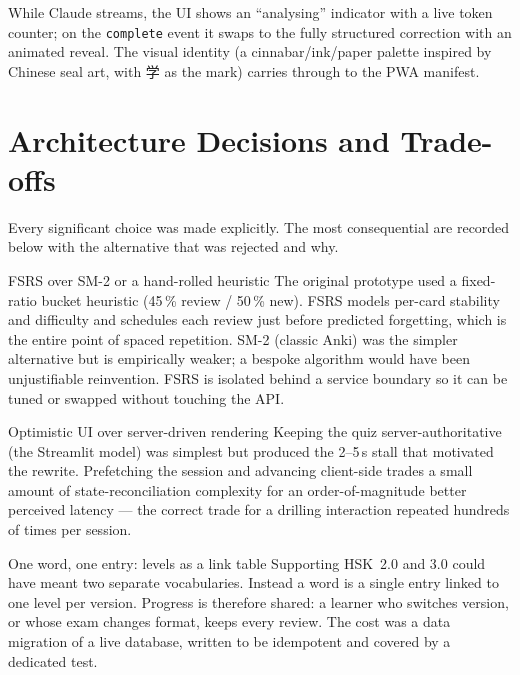 \documentclass[11pt,a4paper]{article}
\newcommand{\han}[1]{{#1}}
\begin{document}
While Claude streams, the UI shows an ``analysing'' indicator with a live token
counter; on the \texttt{complete} event it swaps to the fully structured
correction with an animated reveal. The visual identity (a cinnabar/ink/paper
palette inspired by Chinese seal art, with \han{学} as the mark) carries
through to the PWA manifest.

\section{Architecture Decisions and Trade-offs}

Every significant choice was made explicitly. The most consequential are
recorded below with the alternative that was rejected and why.

\begin{decision}{FSRS over SM-2 or a hand-rolled heuristic}
The original prototype used a fixed-ratio bucket heuristic (45\,\% review /
50\,\% new). FSRS models per-card stability and difficulty and schedules each
review just before predicted forgetting, which is the entire point of spaced
repetition. SM-2 (classic Anki) was the simpler alternative but is empirically
weaker; a bespoke algorithm would have been unjustifiable reinvention. FSRS is
isolated behind a service boundary so it can be tuned or swapped without
touching the API.
\end{decision}

\begin{decision}{Optimistic UI over server-driven rendering}
Keeping the quiz server-authoritative (the Streamlit model) was simplest but
produced the 2--5\,s stall that motivated the rewrite. Prefetching the session
and advancing client-side trades a small amount of state-reconciliation
complexity for an order-of-magnitude better perceived latency --- the correct
trade for a drilling interaction repeated hundreds of times per session.
\end{decision}

\begin{decision}{One word, one entry: levels as a link table}
Supporting HSK~2.0 and 3.0 could have meant two separate vocabularies. Instead a
word is a single entry linked to one level per version. Progress is therefore
shared: a learner who switches version, or whose exam changes format, keeps
every review. The cost was a data migration of a live database, written to be
idempotent and covered by a dedicated test.
\end{decision}
\end{document}
